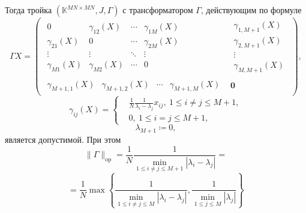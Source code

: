     Тогда тройка \( (\mathbb{K}^{{MN}{\times}{MN}}, J, \Gamma) \)
    с трансформатором \( \Gamma \), действующим по формуле
    \[
        \Gamma X =
        \left(\begin{array}{c|c}
            \begin{matrix}
                0               & \gamma_{12}(X) & \cdots & \gamma_{1M}(X) \\
                \gamma_{21}(X)  & 0              & \cdots & \gamma_{2M}(X) \\
                \vdots          & \vdots         & \ddots & \vdots & \ \\
                \gamma_{M1}(X)  & \gamma_{M2}(X) & \cdots & 0
            \end{matrix} &
            \begin{matrix}
                \gamma_{1,M+1}(X) \\
                \gamma_{2,M+1}(X) \\
                \vdots \\
                \gamma_{M,M+1}(X)
            \end{matrix} \\ \hline
            \begin{matrix}
                \gamma_{M{+}1,1}(X) &
                \gamma_{M{+}1,2}(X) &
                \cdots &
                \gamma_{M{+}1,M}(X)
            \end{matrix} &
            \mathbf{0}
        \end{array}\right),
        \]
    \[
        \gamma_{ij}(X) =
        \left\{\begin{aligned}
            & \frac1N \frac{1}{\lambda_i - \lambda_j} x_{ij},
              \ 1\leq i{\neq}j \leq M{+}1, \\
            & 0,
              \ 1\leq i{=}j \leq M{+}1,
        \end{aligned}\right.
        \]
    \[
        \lambda_{M+1} \coloneqq 0,
        \]
    является допустимой.
    При этом
    \[
        \|\Gamma\|_{\mathrm{op}} =
        \frac1N
        \frac{1}{\min_{1\leq i{\neq}j \leq M{+}1}|\lambda_i - \lambda_j|} =
        \]
    \[
        = \frac1N
         \max\left\{
         \frac{1}{
             \min\limits_{1\leq i{\neq}j \leq M }{|\lambda_i - \lambda_j|}},
         \frac{1}{
             \min\limits_{1\leq j \leq M}{|\lambda_j|}}
         \right\}
        \]
\endgroup

